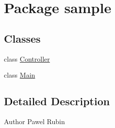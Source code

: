 \hypertarget{namespacesample}{}\section{Package sample}
\label{namespacesample}
\subsection*{Classes}
\begin{DoxyCompactItemize}
\item 
class \hyperlink{classsample_1_1Controller}{Controller}
\item 
class \hyperlink{classsample_1_1Main}{Main}
\end{DoxyCompactItemize}


\subsection{Detailed Description}
\begin{DoxyAuthor}{Author}
Pawel Rubin 
\end{DoxyAuthor}
